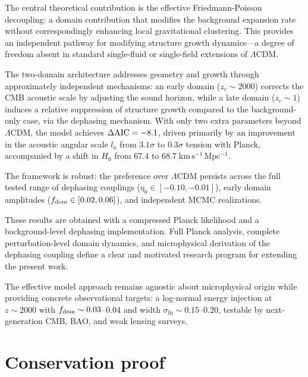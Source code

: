 \documentclass[aps,prd,twocolumn,superscriptaddress,nofootinbib]{revtex4-2}
\newcommand{\fdom}{f_{\rm dom}}
\newcommand{\sln}{\sigma_{\ln}}
\newcommand{\dAIC}{\Delta{\rm AIC}}
\begin{document}
The central theoretical contribution is the effective
Friedmann-Poisson decoupling: a domain contribution that modifies
the background expansion rate without correspondingly enhancing
local gravitational clustering. This provides an independent
pathway for modifying structure growth dynamics---a degree of
freedom absent in standard single-fluid or single-field extensions
of $\Lambda$CDM.

The two-domain architecture addresses geometry and growth through
approximately independent mechanisms: an early domain
($z_c \sim 2000$) corrects the CMB acoustic scale by adjusting
the sound horizon, while a late domain ($z_c \sim 1$) induces a
relative suppression of structure growth compared to the
background-only case, via the dephasing mechanism.
With only two extra parameters beyond $\Lambda$CDM, the model
achieves $\dAIC = -8.1$, driven primarily by an improvement in
the acoustic angular scale $l_a$ from $3.1\sigma$ to $0.3\sigma$
tension with Planck, accompanied by a shift in $H_0$ from $67.4$
to $68.7\;\mathrm{km\,s^{-1}\,Mpc^{-1}}$.

The framework is robust: the preference over $\Lambda$CDM persists
across the full tested range of dephasing couplings
($\eta_0 \in [-0.10, -0.01]$), early domain amplitudes
($\fdom \in [0.02, 0.06]$), and independent MCMC realizations.

These results are obtained with a compressed Planck likelihood and
a background-level dephasing implementation. Full Planck analysis,
complete perturbation-level domain dynamics, and microphysical
derivation of the dephasing coupling define a clear and motivated
research program for extending the present work.

The effective model approach remains agnostic about microphysical
origin while providing concrete observational targets: a
log-normal energy injection at $z \sim 2000$ with
$\fdom \sim 0.03$--$0.04$ and width $\sln \sim 0.15$--$0.20$,
testable by next-generation CMB, BAO, and weak lensing surveys.


\appendix

\section{Conservation proof}
\label{app:conservation}
\end{document}

